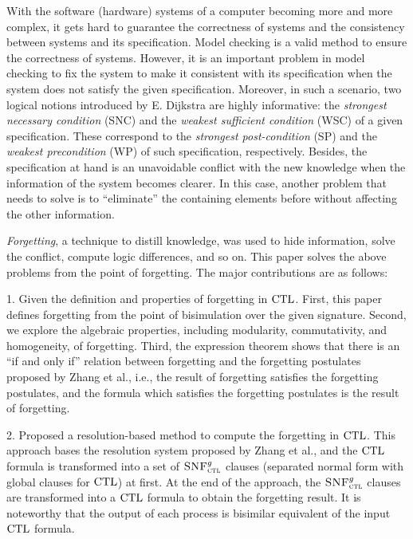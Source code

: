 \begin{englishabstract}
 With the software (hardware) systems of a computer becoming more and more complex, it gets hard to guarantee the correctness of systems and the consistency between systems and its specification.
Model checking is a valid method to ensure the correctness of systems. However, it is an important problem in model checking to fix the system to make it consistent with its specification when the system does not satisfy the given specification.
Moreover, in such a scenario, two logical notions introduced by E. Dijkstra are highly informative: the \emph{strongest necessary condition} (SNC) and the \emph{weakest sufficient condition}  (WSC)  of a given specification. These correspond to the \emph{strongest post-condition} (SP) and the \emph{weakest precondition} (WP) of such specification, respectively.
Besides, the specification at hand is an unavoidable conflict with the new knowledge when the information of the system becomes clearer. In this case, another problem that needs to solve is to ``eliminate” the containing elements before without affecting the other information.

\emph{Forgetting}, a technique to distill knowledge, was used to hide information, solve the conflict, compute logic differences, and so on. This paper solves the above problems from the point of forgetting. The major contributions are as follows:

1. Given the definition and properties of forgetting in $\textrm{CTL}$. First, this paper defines forgetting from the point of bisimulation over the given signature. Second, we explore the algebraic properties, including modularity, commutativity, and homogeneity, of forgetting. Third, the expression theorem shows that there is an ``if and only if” relation between forgetting and the forgetting postulates proposed by Zhang et al., i.e., the result of forgetting satisfies the forgetting postulates, and the formula which satisfies the forgetting postulates is the result of forgetting.

2. Proposed a resolution-based method to compute the forgetting in $\textrm{CTL}$. This approach bases the resolution system proposed by Zhang et al., and the $\textrm{CTL}$ formula is transformed into a set of ${\textsc{SNF}_{\textsc{ctl}}^g}$ clauses (separated normal form with global clauses for $\textrm{CTL}$) at first. At the end of the approach, the ${\textsc{SNF}_{\textsc{ctl}}^g}$ clauses are transformed into a $\textrm{CTL}$ formula to obtain the forgetting result. It is noteworthy that the output of each process is bisimilar equivalent of the input $\textrm{CTL}$ formula.


\end{englishabstract}
